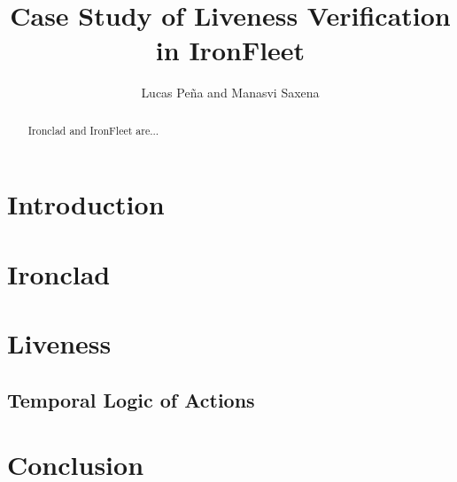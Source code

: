 \documentclass{llncs}
\begin{document}
%
\mainmatter              %
%
\title{Case Study of Liveness Verification in IronFleet}
%
\author{Lucas Pe\~{n}a and Manasvi Saxena}
%

\maketitle              %

\begin{abstract}
Ironclad \cite{ironclad} and IronFleet \cite{ironfleet} are...
\end{abstract}
%
\section{Introduction}
%
\section{Ironclad}
%
\section{Liveness}
%
\subsection{Temporal Logic of Actions}
%
\section{Conclusion}

%
%



\end{document}
